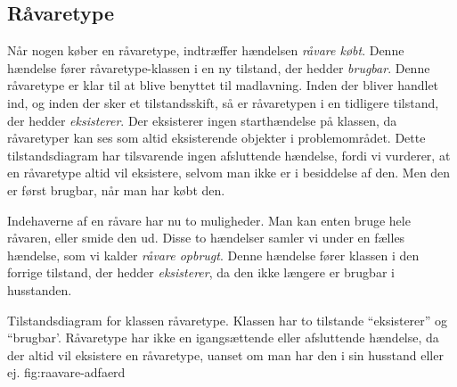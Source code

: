 \subsection{Råvaretype}
Når nogen køber en råvaretype, indtræffer hændelsen \textit{råvare købt}. Denne hændelse fører råvaretype-klassen i en ny tilstand, der hedder \textit{brugbar}. Denne råvaretype er klar til at blive benyttet til madlavning. Inden der bliver handlet ind, og inden der sker et tilstandsskift, så er råvaretypen i en tidligere tilstand, der hedder \textit{eksisterer}. Der eksisterer ingen starthændelse på klassen, da råvaretyper kan ses som altid eksisterende objekter i problemområdet. Dette tilstandsdiagram har tilsvarende ingen afsluttende hændelse, fordi vi vurderer, at en råvaretype altid vil eksistere, selvom man ikke er i besiddelse af den. Men den er først brugbar, når man har købt den. 

Indehaverne af en råvare har nu to muligheder. Man kan enten bruge hele råvaren, eller smide den ud. Disse to hændelser samler vi  under en fælles hændelse, som vi kalder \textit{råvare opbrugt}. Denne hændelse fører klassen i den forrige tilstand, der hedder \textit{eksisterer}, da den ikke længere er brugbar i husstanden. 

  {Tilstandsdiagram for klassen råvaretype. Klassen har to tilstande ``eksisterer'' og ``brugbar'. Råvaretype har ikke en igangsættende eller afsluttende hændelse, da der altid vil eksistere en råvaretype, uanset om man har den i sin husstand eller ej.}
  {fig:raavare-adfaerd}
